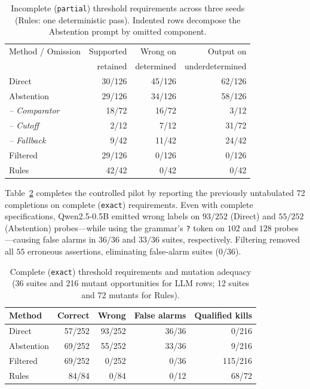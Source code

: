 \documentclass[sigconf,nonacm]{acmart}
\begin{document}
\begin{table}[t]
\caption{Incomplete (\texttt{partial}) threshold requirements across three seeds (Rules: one deterministic pass). Indented rows decompose the Abstention prompt by omitted component.}
\label{tab:threshold}
\centering\small
\begin{tabular}{l r r r}
\toprule
Method / Omission & Supported & Wrong on & Output on\\
 & retained & determined & underdetermined\\
\midrule
Direct & 30/126 & 45/126 & 62/126\\
Abstention & 29/126 & 34/126 & 58/126\\
\quad\emph{-- Comparator} & 18/72 & 16/72 & 3/12\\
\quad\emph{-- Cutoff} & 2/12 & 7/12 & 31/72\\
\quad\emph{-- Fallback} & 9/42 & 11/42 & 24/42\\
Filtered & 29/126 & 0/126 & 0/126\\
Rules & 42/42 & 0/42 & 0/42\\
\bottomrule
\end{tabular}
\end{table}

Table~\ref{tab:threshold-exact} completes the controlled pilot by reporting the previously untabulated 72 completions on complete (\texttt{exact}) requirements. Even with complete specifications, Qwen2.5-0.5B emitted wrong labels on $93/252$ (Direct) and $55/252$ (Abstention) probes---while using the grammar's \texttt{?} token on $102$ and $128$ probes---causing false alarms in $36/36$ and $33/36$ suites, respectively. Filtering removed all $55$ erroneous assertions, eliminating false-alarm suites ($0/36$).

\begin{table}[t]
\caption{Complete (\texttt{exact}) threshold requirements and mutation adequacy (36 suites and 216 mutant opportunities for LLM rows; 12 suites and 72 mutants for Rules).}
\label{tab:threshold-exact}
\centering\small
\setlength{\tabcolsep}{4.2pt}
\begin{tabular}{l r r r r}
\toprule
Method & Correct & Wrong & False alarms & Qualified kills\\
\midrule
Direct & 57/252 & 93/252 & 36/36 & 0/216\\
Abstention & 69/252 & 55/252 & 33/36 & 9/216\\
Filtered & 69/252 & 0/252 & 0/36 & 115/216\\
Rules & 84/84 & 0/84 & 0/12 & 68/72\\
\bottomrule
\end{tabular}
\end{table}
\end{document}
